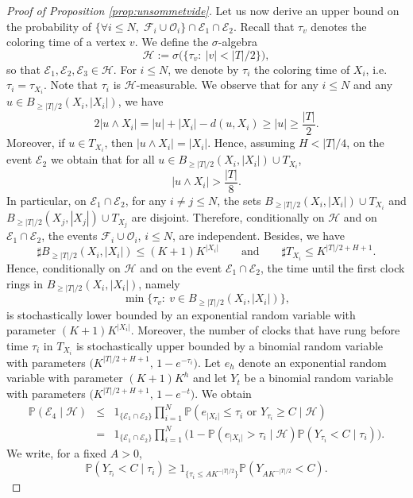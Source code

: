 \documentclass[10pt,a4paper]{amsart}
\newcommand{\Tf}{T}
\renewcommand{\P}{\mathbb{P}}
\begin{document}
\begin{proof}[Proof of Proposition \ref{prop:unsommetvide}]
Let us now derive an upper bound on the probability of
$\{\forall i \le N,\; \mathcal{F}_i \cup \mathcal{O}_i\}\cap \mathcal{E}_1\cap \mathcal{E}_2$.
Recall that $\tau_v$ denotes the coloring time of a vertex $v$. We define the $\sigma$-algebra
$$
\mathcal{H}
:= \sigma\bigl(\{\tau_v:\ |v|<|\Tf|/2\}\bigr),
$$
so that $\mathcal{E}_1,\mathcal{E}_2,\mathcal{E}_3 \in \mathcal{H}$. For $i\le N$, we denote by
$\tau_i$ the coloring time of $X_i$, i.e. $\tau_i=\tau_{X_i}$. Note that $\tau_i$ is $\mathcal{H}$-measurable.
We observe that for any $i\le N$ and any $u\in B_{\ge |\Tf|/2}(X_i,|X_i|)$, we have
$$
2|u\wedge X_i|
= |u| + |X_i| - d(u,X_i)
\ge |u|
\ge \frac{|\Tf|}{2}.
$$
Moreover, if $u\in \Tf_{X_i}$, then $|u\wedge X_i|=|X_i|$. Hence, assuming $H<|\Tf|/4$, on the event $\mathcal{E}_2$ we obtain that for all
$u\in B_{\ge |\Tf|/2}(X_i,|X_i|)\cup \Tf_{X_i}$,
$$
|u\wedge X_i|>\frac{|\Tf|}{8}.
$$
In particular, on $\mathcal{E}_1 \cap \mathcal{E}_2$, for any $i\neq j \le N$, the sets
$B_{\ge |\Tf|/2}(X_i,|X_i|)\cup \Tf_{X_i}$ and
$B_{\ge |\Tf|/2}(X_j,|X_j|)\cup \Tf_{X_j}$
are disjoint. Therefore, conditionally on $\mathcal{H}$ and on $\mathcal{E}_1 \cap \mathcal{E}_2$, the events $\mathcal{F}_i \cup \mathcal{O}_i$, $i\le N$, are independent. Besides, we have
$$
\sharp B_{\ge |\Tf|/2}(X_i, |X_i|) \le (K+1)K^{|X_i|}
\qquad \text{and} \qquad
\sharp\Tf_{X_i} \le K^{|\Tf|/2+H+1}.
$$
Hence, conditionally on $\mathcal{H}$ and on the event $\mathcal{E}_1 \cap \mathcal{E}_2$, the time until the first clock rings in $B_{\ge |\Tf|/2}(X_i, |X_i|)$,
namely
\[
\min\{\tau_v:\ v\in B_{\ge |\Tf|/2}(X_i, |X_i|)\},
\]
is stochastically lower bounded by an exponential random variable with parameter $(K+1)K^{|X_i|}$. Moreover, the number of clocks that have rung before time $\tau_i$ in $\Tf_{X_i}$ is stochastically upper bounded by a binomial random variable with parameters $\bigl(K^{|\Tf|/2+H+1},\, 1-e^{-\tau_i}\bigr)$. Let $e_h$ denote an exponential random variable with parameter $(K+1)K^{h}$ and let $Y_t$ be a binomial random variable with parameters $\bigl(K^{|\Tf|/2+H+1},\, 1-e^{-t}\bigr)$. We obtain
\begin{eqnarray*}
\P(\mathcal{E}_4\mid \mathcal{H})&\le& 1_{\{\mathcal{E}_1\cap \mathcal{E}_2\}} \prod_{i=1}^N\P(e_{|X_i|}\le \tau_i \mbox{ or } Y_{\tau_i}\ge C \mid \mathcal{H})\\
&=& 1_{\{\mathcal{E}_1\cap \mathcal{E}_2\}} \prod_{i=1}^N\Big(1-\P(e_{|X_i|}> \tau_i \mid \mathcal{H})\P( Y_{\tau_i}<C \mid \tau_i)\Big).\end{eqnarray*}
We write, for a fixed $A>0$,
$$\P( Y_{\tau_i}<C \mid \tau_i)\ge 1_{\{\tau_i\le A K^{-|\Tf|/2}\}}\P(Y_{A K^{-|\Tf|/2}}<C).$$

\end{proof}
\end{document}

